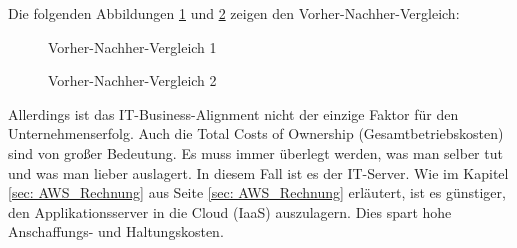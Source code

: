 Die folgenden Abbildungen \ref{img:Fazit1} und \ref{img:Fazit2} zeigen den Vorher-Nachher-Vergleich:
\begin{figure}[H]
\centering
\begin{minipage}[t]{1\textwidth}
\caption{Vorher-Nachher-Vergleich 1} %
\label{img:Fazit1}
\end{minipage}
\end{figure}

\begin{figure}[H]
\centering
\begin{minipage}[t]{1\textwidth}
\caption{Vorher-Nachher-Vergleich 2} %
\label{img:Fazit2}
\end{minipage}
\end{figure}
\newpage

Allerdings ist das IT-Business-Alignment nicht der einzige Faktor für den Unternehmenserfolg.
Auch die Total Costs of Ownership (Gesamtbetriebskosten) sind von großer Bedeutung. Es muss immer überlegt werden, was man selber tut und was man lieber auslagert. In diesem  Fall ist es der IT-Server. Wie im Kapitel \ref{sec: AWS_Rechnung} aus Seite \ref{sec: AWS_Rechnung} erläutert, ist es günstiger, den Applikationsserver in die Cloud (IaaS) auszulagern. Dies spart hohe Anschaffungs- und Haltungskosten.
